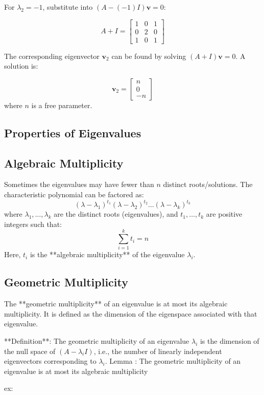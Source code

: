 \documentclass{article}
\begin{document}
For \( \lambda_2 = -1 \), substitute into \( (A - (-1)I)\mathbf{v} = 0 \):

\[
A + I = \begin{bmatrix}
    1 & 0 & 1 \\
    0 & 2 & 0 \\
    1 & 0 & 1
\end{bmatrix}
\]

The corresponding eigenvector \( \mathbf{v}_2 \) can be found by solving \( (A + I) \mathbf{v} = 0 \). A solution is:

\[
\mathbf{v}_2 = \begin{bmatrix}
    n \\
    0 \\
    -n
\end{bmatrix}
\]
where \( n \) is a free parameter.
\subsection{Properties of Eigenvalues}

\subsection{Algebraic Multiplicity}
Sometimes the eigenvalues may have fewer than \( n \) distinct roots/solutions. The characteristic polynomial can be factored as:
\[
(\lambda - \lambda_1)^{t_1} (\lambda - \lambda_2)^{t_2} \dots (\lambda - \lambda_k)^{t_k}
\]
where \( \lambda_1, \dots, \lambda_k \) are the distinct roots (eigenvalues), and \( t_1, \dots, t_k \) are positive integers such that:
\[
\sum_{i=1}^{k} t_i = n
\]
Here, \( t_i \) is the **algebraic multiplicity** of the eigenvalue \( \lambda_i \).


\date{\today}
\subsection{Geometric Multiplicity}
The **geometric multiplicity** of an eigenvalue is at most its algebraic multiplicity. It is defined as the dimension of the eigenspace associated with that eigenvalue.

**Definition**: The geometric multiplicity of an eigenvalue \( \lambda_i \) is the dimension of the null space of \( (A - \lambda_i I) \), i.e., the number of linearly independent eigenvectors corresponding to \( \lambda_i \).
Lemma : The geometric multiplicity of an eigenvalue is at most its algebraic multiplicity

ex:
\end{document}
